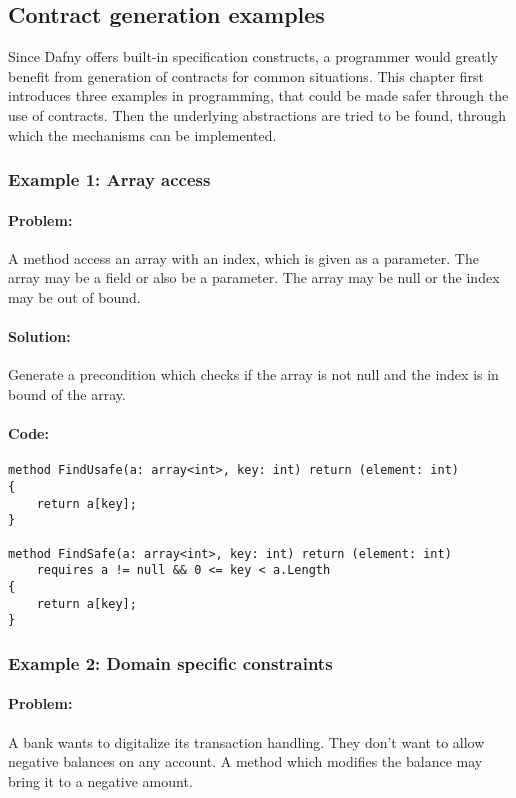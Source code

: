 \subsection{Contract generation examples}
Since Dafny offers built-in specification constructs, a programmer would greatly benefit from generation of contracts for common situations. This chapter first introduces three examples in programming, that could be made safer through the use of contracts. Then the underlying abstractions are tried to be found, through which the mechanisms can be implemented.  
\subsubsection{Example 1: Array access} \label{Example 1}

\paragraph{Problem:}

A method access an array with an index, which is given as a parameter. The array may be a field or also be a parameter. The array may be null or the index may be out of bound.
\paragraph{Solution:}
Generate a precondition which checks if the array is not null and the index is in bound of the array.

\paragraph{Code:}
\lstset{style=dafny}
\begin{lstlisting}
method FindUsafe(a: array<int>, key: int) return (element: int)
{
	return a[key];
}

method FindSafe(a: array<int>, key: int) return (element: int)
	requires a != null && 0 <= key < a.Length
{
	return a[key];
}
\end{lstlisting}



\subsubsection{Example 2: Domain specific constraints} \label{Example 2}
\paragraph{Problem:}
A bank wants to digitalize its transaction handling. They don’t want to allow negative balances on any account. A method which modifies the balance may bring it to a negative amount.
